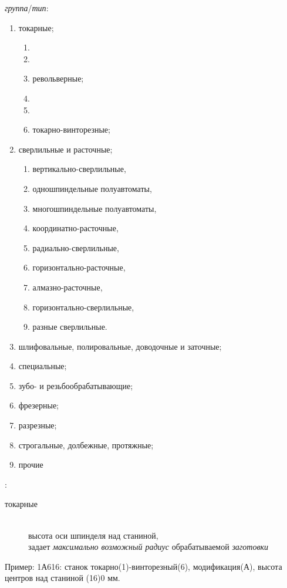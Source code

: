 \bigskip
\noindent\emph{группа}/\emph{тип}:
\begin{enumerate}[label={\arabic*}]
  \item токарные;
  \begin{enumerate}[label={\arabic*}]
    \item 
    \item 
    \item револьверные;
    \item 
    \item 
    \item токарно-винторезные;
  \end{enumerate}
  \item сверлильные и расточные;
  \begin{enumerate}[label={\arabic*}]
    \item вертикально-сверлильные,
    \item одношпиндельные полуавтоматы,
    \item многошпиндельные полуавтоматы,
    \item координатно-расточные,
    \item радиально-сверлильные,
    \item горизонтально-расточные,
    \item алмазно-расточные,
    \item горизонтально-сверлильные,
    \item разные сверлильные.  
  \end{enumerate}
  \item шлифовальные, полировальные, доводочные и заточные;
  \item специальные;
  \item зубо- и резьбообрабатывающие;
  \item фрезерные;
  \item разрезные;
  \item строгальные, долбежные, протяжные;
  \item прочие
\end{enumerate}

\bigskip
{}:
\begin{description}
\item[токарные] \hfill \\
высота оси шпинделя над станиной, \\
задает \emph{максимально возможный радиус} обрабатываемой \emph{заготовки}
\end{description}

\bigskip
Пример: 1А616: станок токарно(1)-винторезный(6), модификация(А), высота
центров над станиной (16)0 мм.


\secup

\secup
